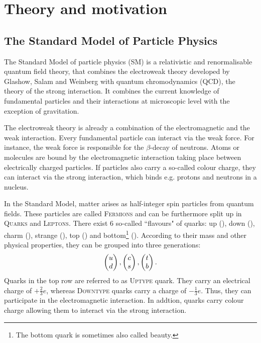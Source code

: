 \chapter{Theory and motivation}
\label{sec:Theory}

\section{The Standard Model of Particle Physics}
The Standard Model of particle physics (SM) is a relativistic and renormalisable quantum field theory, that combines the electroweak theory developed by Glashow, Salam and Weinberg \cite{SM_Glashow, SM_Salam, SM_Weinberg} with quantum chromodynamics (QCD), the theory of the strong interaction.
It combines the current knowledge of fundamental particles and their interactions at microscopic level with the exception of gravitation.

The electroweak theory is already a combination of the electromagnetic and the weak interaction.
Every fundamental particle can interact via the weak force.
For instance, the weak force is responsible for the $\beta$-decay of neutrons.
Atoms or molecules are bound by the electromagnetic interaction taking place between electrically charged particles.
If particles also carry a so-called colour charge, they can interact via the strong interaction, which binds e.g. protons and neutrons in a nucleus.

In the Standard Model, matter arises as half-integer spin particles from quantum fields.
These particles are called \textsc{Fermions} and can be furthermore split up in \textsc{Quarks} and \textsc{Leptons}.
There exist 6 so-called ``flavours" of quarks: up (\uquark), down (\cquark), charm (\cquark), strange (\squark), top (\tquark) and bottom\footnote{The bottom quark is sometimes also called beauty.} (\bquark).
According to their mass and other physical properties, they can be grouped into three generations:
\begin{align*}
    \begin{pmatrix} {\ensuremath{u}} \\ {d} \end{pmatrix},
    \begin{pmatrix} {\ensuremath{c}} \\ {s} \end{pmatrix},
    \begin{pmatrix} {\ensuremath{t}} \\ {b} \end{pmatrix}.
\end{align*}
Quarks in the top row are referred to as \textsc{Uptype} quark.
They carry an electrical charge of $+\frac{2}{3}e$, whereas \textsc{Downtype} quarks carry a charge of $-\frac{1}{3}e$.
Thus, they can participate in the electromagnetic interaction.
In addtion, quarks carry colour charge allowing them to interact via the strong interaction.


